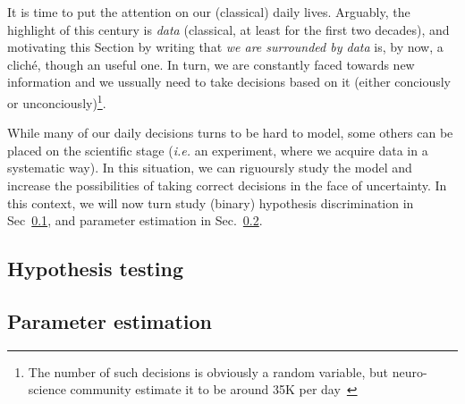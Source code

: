 It is time to put the attention on our (classical) daily lives. Arguably, the highlight of this century is \textit{data} (classical, at least for the first two decades), and motivating this Section by writing that \textit{we are surrounded by data} is, by now, a cliché, though an useful one. In turn, we are constantly faced towards new information and we ussually need to take decisions based on it (either conciously or unconciously)\footnote{The number of such decisions is obviously a random variable, but neuro-science community estimate it to be around 35K per day~\cite{sahakian_bad_2013}}.

While many of our daily decisions turns to be hard to model, some others can be placed on the scientific stage (\textit{i.e.} an experiment, where we acquire data in a systematic way). In this situation, we can riguoursly study the model and increase the possibilities of taking correct decisions in the face of uncertainty. In this context, we will now turn study (binary) hypothesis discrimination in Sec~\ref{ssec:1_hypo_testing}, and parameter estimation in Sec.~\ref{ssec:1_stinf_estimation}.

\subsection{Hypothesis testing}\label{ssec:1_hypo_testing}

\subsection{Parameter estimation}\label{ssec:1_stinf_estimation}

